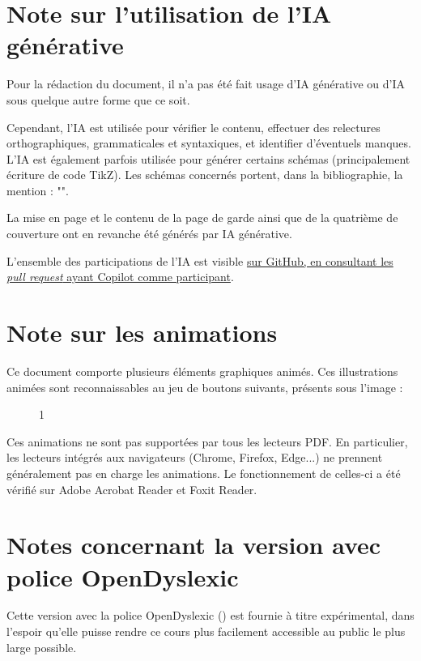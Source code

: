 \documentclass[a4paper,12pt,oneside]{report} %
\begin{document}
	\section{Note sur l'utilisation de l'IA générative}
	Pour la rédaction du document, il n'a pas été fait usage d'IA générative ou d'IA sous quelque autre forme que ce soit.
	
	Cependant, l'IA est utilisée pour vérifier le contenu, effectuer des relectures orthographiques, grammaticales et syntaxiques, et identifier d'éventuels manques. L'IA est également parfois utilisée pour générer certains schémas (principalement écriture de code TikZ). Les schémas concernés portent, dans la bibliographie, la mention : "\iaAssisted".
	
	La mise en page et le contenu de la page de garde ainsi que de la quatrième de couverture ont en revanche été générés par IA générative.
	
	L'ensemble des participations de l'IA est visible \href{https://github.com/cvermot/coursBia/pulls?q=is\%3Apr+state\%3Aclosed+involves\%3A\%40copilot}{sur GitHub, en consultant les \textit{pull request} ayant Copilot comme participant}.
	
	\section{Note sur les animations}
	Ce document comporte plusieurs éléments graphiques animés. Ces illustrations animées sont reconnaissables au jeu de boutons suivants, présents sous l'image :
	\begin{figure}[H]	
	\centering
	\begin{animateinline}{1}
	\end{animateinline}
	\end{figure}
	
	Ces animations ne sont pas supportées par tous les lecteurs PDF. En particulier, les lecteurs intégrés aux navigateurs (Chrome, Firefox, Edge...) ne prennent généralement pas en charge les animations. Le fonctionnement de celles-ci a été vérifié sur Adobe Acrobat Reader et Foxit Reader.
	
	\ifdefined\opendys 
	\section{Notes concernant la version avec police OpenDyslexic}
	Cette version avec la police OpenDyslexic (\cite{font:openDys}) est fournie à titre expérimental, dans l'espoir qu'elle puisse rendre ce cours plus facilement accessible au public le plus large possible.
\end{document}
